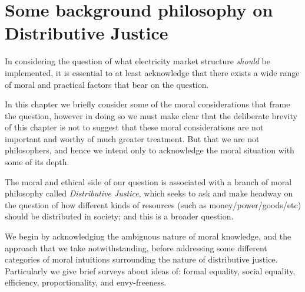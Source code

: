 \chapter{Some background philosophy on Distributive Justice}
\label{cha:background}\label{sec:philosophy}


In considering the question of what electricity market structure \textit{should} be implemented, it is essential to at least acknowledge that there exists a wide range of moral and practical factors that bear on the question.

In this chapter we briefly consider some of the moral considerations that frame the question, however in doing so we must make clear that the deliberate brevity of this chapter is not to suggest that these moral considerations are not important and worthy of much greater treatment. But that we are not philosophers, and hence we intend only to acknowledge the moral situation with some of its depth.


The moral and ethical side of our question is associated with a branch of moral philosophy called \textit{Distributive Justice}, which seeks to ask and make headway on the question of how different kinds of resources (such as money/power/goods/etc) should be distributed in society; and this is a broader question.

We begin by acknowledging the ambiguous nature of moral knowledge, and the approach that we take notwithstanding, before addressing some different categories of moral intuitions surrounding the nature of distributive justice.
Particularly we give brief surveys about ideas of: formal equality, social equality, efficiency, proportionality, and envy-freeness.


